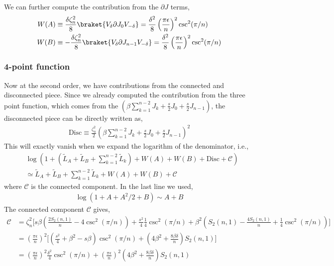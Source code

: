 \documentclass[11pt]{article}
\newcommand{\ep}{\epsilon}
\newcommand{\p}{\partial}
\newcommand{\lb}{\left(}
\newcommand{\rb}{\right)}
\begin{document}
We can further compute the contribution from the $\p J$ terms,
\begin{align}
    W(A) &\equiv \frac{\delta \zeta_n^2}{8}\braket{V_\delta \p J_0 V_{-\delta}} = \frac{\delta^2}{8}\lb\frac{\pi \ep}{n}\rb^2 \csc^2 (\pi/n) \\
    W(B) &\equiv -\frac{\delta \zeta_n^2}{8}\braket{V_\delta \p J_{n-1} V_{-\delta}} = \frac{\delta^2}{8}\lb\frac{\pi \ep}{n}\rb^2 \csc^2 (\pi/n)  
\end{align}

\subsubsection{4-point function}
Now at the second order, we have contributions from the connected and disconnected piece.
Since we already computed the contribution from the three point function, which comes from the 
$(\beta \sum_{k=1}^{n-2}J_k + \frac{s}{2}J_0 + \frac{s}{2}J_{n-1})$, the disconnected piece can be directly written as,
\begin{align}
    \text{Disc} \equiv \frac{\zeta_n^2}{2}\lb \beta \sum_{k=1}^{n-2}J_k + \frac{s}{2}J_0 + \frac{s}{2}J_{n-1}\rb^2
\end{align}
This will exactly vanish when we expand the logarithm of the denominator, i.e.,
\begin{align}
    &\log \lb 1+ \lb \tilde{L}_A + \tilde{L}_B + \sum_{k=1}^{n-2}\tilde{L}_k\rb  + W(A)+ W(B)+ \text{Disc} + \mathcal{C}\rb \\
    &\simeq  \tilde{L}_A + \tilde{L}_B + \sum_{k=1}^{n-2}\tilde{L}_k  + W(A)+ W(B) +\mathcal{C}
\end{align}
where $\mathcal{C}$ is the connected component. In the last line we used,
\begin{align}
    \log (1 + A + A^2/2 + B) \sim A + B
\end{align}
The connected component $\mathcal{C}$ gives,
\begin{align}
    \mathcal{C} &= \zeta_n^2 \Bigg[ s\beta \lb \frac{2S_2(n,1)}{n} - 4\csc^2(\pi/n)  \rb   + \frac{s^2}{4}\frac{1}{4}\csc^2(\pi/n) + \beta^2 \lb S_2(n,1) -\frac{4S_2(n,1)}{n} + \frac{1}{4}\csc^2(\pi/n)\rb\Bigg]  \\
    &=\lb\frac{\pi \ep}{n}\rb^2\Bigg[\lb \frac{s^2}{4}+\beta^2 - s\beta\rb \csc^2(\pi/n) + \lb4\beta^2 + \frac{8\beta \delta}{n}\rb S_2(n,1)\Bigg] \\
    &= \lb\frac{\pi \ep}{n}\rb^2 \frac{\delta^2}{4}\csc^2(\pi/n) + \lb\frac{\pi \ep}{n}\rb^2 \lb4\beta^2 + \frac{8\beta \delta}{n}\rb S_2(n,1)
\end{align}
\end{document}
